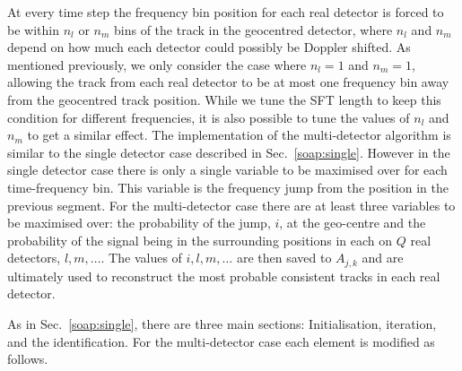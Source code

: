 %
%
At every time step the frequency bin position for each real detector is forced to be within $n_l$ or $n_m$ bins of the track in the geocentred detector, where $n_l$ and $n_m$ depend on how much each detector could possibly be Doppler shifted. As mentioned previously, we only consider the case where $n_l=1$ and $n_m = 1$,  allowing the track from each real detector to be at most one frequency bin away from the geocentred track position. While we tune the \gls{SFT} length to keep this condition for different frequencies, it is also possible to tune the values of $n_l$ and $n_m$ to get a similar effect.
%
%
The implementation of the multi-detector algorithm is similar to the single detector case described in Sec.~\ref{soap:single}.  However in the single detector case there is only a single variable to be maximised over for each time-frequency bin. This variable is the frequency jump from the position in the previous segment. For the multi-detector case there are at least three variables to be maximised over: the probability of the jump, $i$, at the geo-centre and the probability of the signal being in the surrounding positions in each on $Q$ real detectors, $l,m,\dots$. The values of $i,l,m, \dots$ are then saved to $A_{j,k}$ and are ultimately used to reconstruct the most probable consistent tracks in each real detector.

%
%
As in Sec.~\ref{soap:single}, there are three main sections: Initialisation, iteration, and the identification. For the multi-detector case each element is modified as follows.

